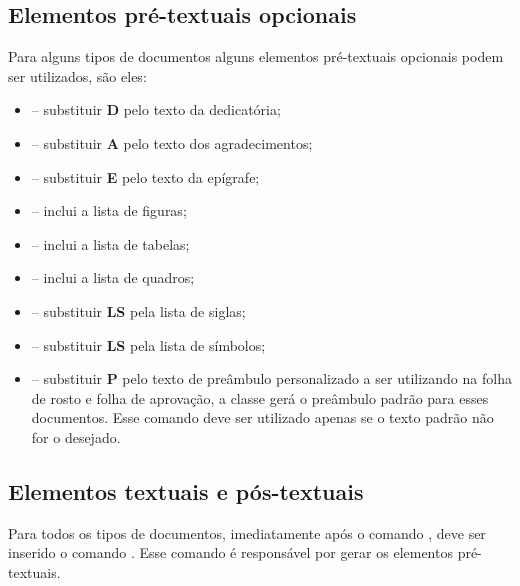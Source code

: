 \documentclass[artigo]{iftex2024}
\begin{document}
\subsection{Elementos pré-textuais opcionais} \label{sec:pre_opcionais}

Para alguns tipos de documentos alguns elementos pré-textuais opcionais podem ser utilizados, são eles:
\begin{itemize}
  \item[]  -- substituir \textbf{D} pelo texto da dedicatória;

  \item[]  -- substituir \textbf{A} pelo texto dos agradecimentos;

  \item[]  -- substituir \textbf{E} pelo texto da epígrafe;

  \item[]  -- inclui a lista de figuras;

  \item[]  -- inclui a lista de tabelas;

  \item[]  -- inclui a lista de quadros;

  \item[]  -- substituir \textbf{LS} pela lista de siglas;

  \item[]  -- substituir \textbf{LS} pela lista de símbolos;

  \item[]  -- substituir \textbf{P} pelo texto de preâmbulo personalizado a ser utilizando na folha de rosto e folha de aprovação, a classe {\iftex} gerá o preâmbulo padrão para esses documentos. Esse comando deve ser utilizado apenas se o texto padrão não for o desejado.
\end{itemize}

\subsection{Elementos textuais e pós-textuais} \label{sec:textuais_postextuais}

Para todos os tipos de documentos, imediatamente após o comando , deve ser inserido o comando .
Esse comando é responsável por gerar os elementos pré-textuais.
\end{document}
